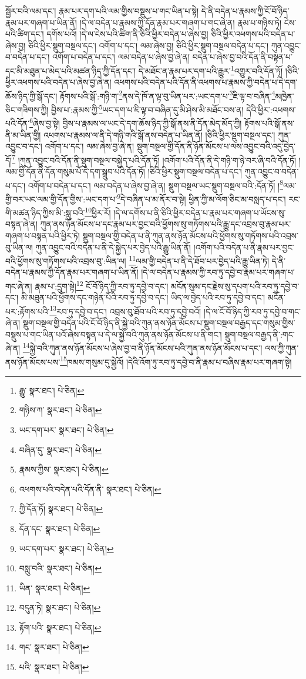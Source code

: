 སྦྱོར་བའི་ལམ་དང་། རྣམ་པར་དག་པའི་ལམ་གྱིས་བསྡུས་པ་གང་ཡིན་པ་སྟེ། དེ་ནི་བདེན་པ་རྣམས་ཀྱི་ངོ་བོ་ཉིད་རྣམ་པར་གཞག་པ་ཡིན་ནོ། །དེ་ལ་བདེན་པ་རྣམས་ཀྱི་དོན་རྣམ་པར་གཞག་པ་གང་ཞེ་ན། རྣམ་པ་གཉིས་ཏེ། ངེས་པའི་ཚིག་དང་། དགོས་པའོ། །དེ་ལ་ངེས་པའི་ཚིག་ནི་ཅིའི་ཕྱིར་བདེན་པ་ཞེས་བྱ། ཅིའི་ཕྱིར་འཕགས་པའི་བདེན་པ་ཞེས་བྱ། ཅིའི་ཕྱིར་སྡུག་བསྔལ་དང་། འགོག་པ་དང་། ལམ་ཞེས་བྱ། ཅིའི་ཕྱིར་སྡུག་བསྔལ་བདེན་པ་དང་། ཀུན་འབྱུང་བ་བདེན་པ་དང་། འགོག་པ་བདེན་པ་དང་། ལམ་བདེན་པ་ཞེས་བྱ་ཞེ་ན། བདེན་པ་ཞེས་བྱ་བའི་དོན་ནི་བསྟན་པ་དང་མི་མཐུན་པ་མེད་པའི་མཚན་ཉིད་ཀྱི་དོན་དང་། དེ་མཐོང་ན་རྣམ་པར་དག་པའི་རྒྱུར་\footnote{རྒྱུ་  སྣར་ཐང་།  པེ་ཅིན། }འགྱུར་བའི་དོན་ཏོ། །ཅིའི་ཕྱིར་འཕགས་པའི་བདེན་པ་ཞེས་བྱ་ཞེ་ན། འཕགས་པའི་བདེན་པའི་དོན་ནི་འཕགས་པ་རྣམས་ཀྱི་བདེན་པ་དེ་དག་ཆོས་ཉིད་ཀྱི་སྒོ་དང་། རྟོགས་པའི་སྒོ་:གཉི་ག་\footnote{གཉིས་ཀ་  སྣར་ཐང་།  པེ་ཅིན། }ནས་དེ་ཁོ་ན་ལྟ་བུ་ཡིན་པར་:ཡང་དག་པ་\footnote{ཡང་དག་པར་  སྣར་ཐང་།  པེ་ཅིན། }ཇི་ལྟ་བ་བཞིན་\footnote{བཞིན་དུ་  སྣར་ཐང་།  པེ་ཅིན། }མཁྱེན་ཅིང་གཟིགས་ཀྱི། བྱིས་པ་:རྣམས་ཀྱི་\footnote{རྣམས་ཀྱིས་  སྣར་ཐང་།  པེ་ཅིན། }ཡང་དག་པ་ཇི་ལྟ་བ་བཞིན་དུ་མི་ཤེས་མི་མཐོང་བས་ན། དེའི་ཕྱིར་:འཕགས་པའི་དོན་\footnote{འཕགས་པའི་བདེན་པའི་དོན་ནི་  སྣར་ཐང་།  པེ་ཅིན། }ཞེས་བྱ་སྟེ། བྱིས་པ་རྣམས་ལ་ཡང་དེ་དག་ཆོས་ཉིད་ཀྱི་སྒོ་ནས་ནི་དོན་མེད་མོད་ཀྱི། རྟོགས་པའི་སྒོ་ནས་ནི་མ་ཡིན་གྱི། འཕགས་པ་རྣམས་ལ་ནི་དེ་གཉི་གའི་སྒོ་ནས་བདེན་པ་ཡིན་ནོ། །ཅིའི་ཕྱིར་སྡུག་བསྔལ་དང་། ཀུན་འབྱུང་བ་དང་། འགོག་པ་དང་། ལམ་ཞེས་བྱ་ཞེ་ན། སྡུག་བསྔལ་གྱི་དོན་ནི་ཉོན་མོངས་པ་ལས་འབྱུང་བའི་འདུ་བྱེད་དོ།\footnote{ཀྱི་དོན་ཏོ།  སྣར་ཐང་།  པེ་ཅིན། } །ཀུན་འབྱུང་བའི་དོན་ནི་སྡུག་བསྔལ་བསྐྱེད་པའི་དོན་ཏོ། །འགོག་པའི་དོན་ནི་དེ་གཉི་ག་ཉེ་བར་ཞི་བའི་དོན་ཏོ། །ལམ་གྱི་དོན་ནི་དོན་གསུམ་པོ་དེ་དག་སྒྲུབ་པའི་དོན་ཏོ། །ཅིའི་ཕྱིར་སྡུག་བསྔལ་བདེན་པ་དང་། ཀུན་འབྱུང་བ་བདེན་པ་དང་། འགོག་པ་བདེན་པ་དང་། ལམ་བདེན་པ་ཞེས་བྱ་ཞེ་ན། སྡུག་བསྔལ་ཡང་སྡུག་བསྔལ་བའི་:དོན་ཏོ། །\footnote{དོན་དང་  སྣར་ཐང་།  པེ་ཅིན། }ལམ་གྱི་བར་ཡང་ལམ་གྱི་དོན་གྱིས་:ཡང་དག་པ་\footnote{ཡང་དག་པར་  སྣར་ཐང་།  པེ་ཅིན། }དེ་བཞིན་པ་མ་ནོར་བ་སྟེ། ཕྱིན་ཀྱི་མ་ལོག་ཅིང་མ་བསླད་པ་དང་། རང་གི་མཚན་ཉིད་ཀྱིས་མི་:སླུ་བའི་\footnote{བསླུ་བའི་  སྣར་ཐང་།  པེ་ཅིན། }ཕྱིར་རོ། །དེ་ལ་དགོས་པ་ནི་ཅིའི་ཕྱིར་བདེན་པ་རྣམ་པར་གཞག་པ་ཡོངས་སུ་བསྟན་ཞེ་ན། ཀུན་ནས་ཉོན་མོངས་པ་དང་རྣམ་པར་བྱང་བའི་ཕྱོགས་སུ་གཏོགས་པའི་རྒྱུ་དང་འབྲས་བུ་རྣམ་པར་གཞག་པ་བསྟན་པའི་ཕྱིར་ཏེ། སྡུག་བསྔལ་གྱི་བདེན་པ་ནི་ཀུན་ནས་ཉོན་མོངས་པའི་ཕྱོགས་སུ་གཏོགས་པའི་འབྲས་བུ་ཡིན་ལ། ཀུན་འབྱུང་བའི་བདེན་པ་ནི་དེ་སྐྱེད་པར་བྱེད་པའི་རྒྱུ་ཡིན་ནོ། །འགོག་པའི་བདེན་པ་ནི་རྣམ་པར་བྱང་བའི་ཕྱོགས་སུ་གཏོགས་པའི་འབྲས་བུ་:ཡིན་ལ། \footnote{ཡིན་  སྣར་ཐང་།  པེ་ཅིན། }ལམ་གྱི་བདེན་པ་ནི་དེ་ཐོབ་པར་བྱེད་པའི་རྒྱུ་ཡིན་ཏེ། དེ་ནི་བདེན་པ་རྣམས་ཀྱི་དོན་རྣམ་པར་གཞག་པ་ཡིན་ནོ། །དེ་ལ་བདེན་པ་རྣམས་ཀྱི་རབ་ཏུ་དབྱེ་བ་རྣམ་པར་གཞག་པ་གང་ཞེ་ན། རྣམ་པ་:དྲུག་སྟེ།\footnote{བདུན་ཏེ།  སྣར་ཐང་།  པེ་ཅིན། } ངོ་བོ་ཉིད་ཀྱི་རབ་ཏུ་དབྱེ་བ་དང་། མངོན་སུམ་དང་རྗེས་སུ་དཔག་པའི་རབ་ཏུ་དབྱེ་བ་དང་། མི་མཐུན་པའི་ཕྱོགས་དང་གཉེན་པོའི་རབ་ཏུ་དབྱེ་བ་དང་། ཡིད་ལ་བྱེད་པའི་རབ་ཏུ་དབྱེ་བ་དང་། མངོན་པར་:རྟོགས་པའི་\footnote{རྟོག་པའི་  སྣར་ཐང་།  པེ་ཅིན། }རབ་ཏུ་དབྱེ་བ་དང་། འབྲས་བུ་ཐོབ་པའི་རབ་ཏུ་དབྱེ་བའོ། །དེ་ལ་ངོ་བོ་ཉིད་ཀྱི་རབ་ཏུ་དབྱེ་བ་གང་ཞེ་ན། སྡུག་བསྔལ་གྱི་བདེན་པའི་ངོ་བོ་ཉིད་ནི་སྐྱེ་བའི་ཀུན་ནས་ཉོན་མོངས་པ་སྡུག་བསྔལ་བརྒྱད་དང་གསུམ་གྱིས་བསྡུས་པ་གང་ཡིན་པའོ་ཞེས་བསྟན་པ་དེ་ལ་སྐྱེ་བའི་ཀུན་ནས་ཉོན་མོངས་པ་ནི་གང་། སྡུག་བསྔལ་བརྒྱད་ནི་:གང་ཞེ་ན། \footnote{གང་  སྣར་ཐང་།  པེ་ཅིན། }སྐྱེ་བའི་ཀུན་ནས་ཉོན་མོངས་པ་ཞེས་བྱ་བ་ནི་ཉོན་མོངས་པའི་ཀུན་ནས་ཉོན་མོངས་པ་དང་། ལས་ཀྱི་ཀུན་ནས་ཉོན་མོངས་པས་\footnote{པའི་  སྣར་ཐང་།  པེ་ཅིན། }ཁམས་གསུམ་དུ་སྐྱེའོ། །དེའི་འོག་ཏུ་རབ་ཏུ་དབྱེ་བ་ནི་རྣམ་པ་བཞིས་རྣམ་པར་གཞག་སྟེ། 